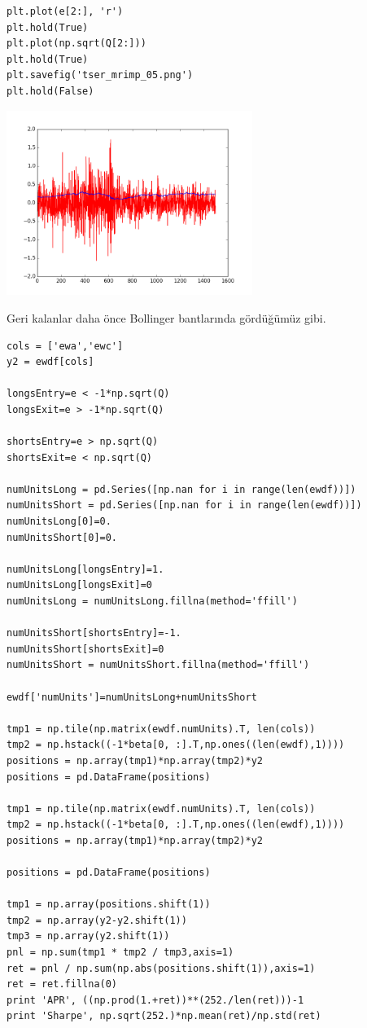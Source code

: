 \documentclass[12pt,fleqn]{article}\usepackage{../../common}
\begin{document}
\begin{verbatim}
plt.plot(e[2:], 'r')
plt.hold(True)
plt.plot(np.sqrt(Q[2:]))
plt.hold(True)
plt.savefig('tser_mrimp_05.png')
plt.hold(False)
\end{verbatim}

\includegraphics[height=6cm]{tser_mrimp_05.png}

Geri kalanlar daha önce Bollinger bantlarında gördüğümüz gibi.

\begin{verbatim}
cols = ['ewa','ewc']
y2 = ewdf[cols]

longsEntry=e < -1*np.sqrt(Q)
longsExit=e > -1*np.sqrt(Q)

shortsEntry=e > np.sqrt(Q)
shortsExit=e < np.sqrt(Q)

numUnitsLong = pd.Series([np.nan for i in range(len(ewdf))])
numUnitsShort = pd.Series([np.nan for i in range(len(ewdf))])
numUnitsLong[0]=0.
numUnitsShort[0]=0.

numUnitsLong[longsEntry]=1.
numUnitsLong[longsExit]=0
numUnitsLong = numUnitsLong.fillna(method='ffill')

numUnitsShort[shortsEntry]=-1.
numUnitsShort[shortsExit]=0
numUnitsShort = numUnitsShort.fillna(method='ffill')

ewdf['numUnits']=numUnitsLong+numUnitsShort

tmp1 = np.tile(np.matrix(ewdf.numUnits).T, len(cols))
tmp2 = np.hstack((-1*beta[0, :].T,np.ones((len(ewdf),1))))
positions = np.array(tmp1)*np.array(tmp2)*y2
positions = pd.DataFrame(positions)

tmp1 = np.tile(np.matrix(ewdf.numUnits).T, len(cols))
tmp2 = np.hstack((-1*beta[0, :].T,np.ones((len(ewdf),1))))
positions = np.array(tmp1)*np.array(tmp2)*y2

positions = pd.DataFrame(positions)

tmp1 = np.array(positions.shift(1))
tmp2 = np.array(y2-y2.shift(1))
tmp3 = np.array(y2.shift(1))
pnl = np.sum(tmp1 * tmp2 / tmp3,axis=1)
ret = pnl / np.sum(np.abs(positions.shift(1)),axis=1)
ret = ret.fillna(0)
print 'APR', ((np.prod(1.+ret))**(252./len(ret)))-1
print 'Sharpe', np.sqrt(252.)*np.mean(ret)/np.std(ret)
\end{verbatim}
\end{document}
